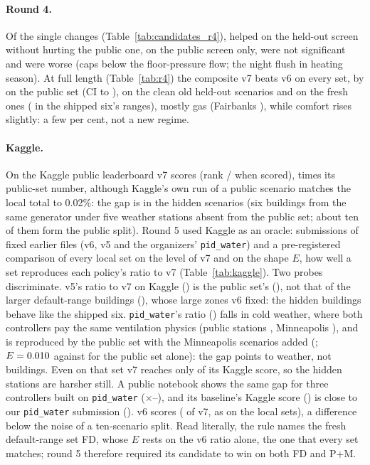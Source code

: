 \documentclass{article}
\begin{document}
\paragraph{Round 4.}
Of the \RFNSingles{} single changes (Table~\ref{tab:candidates_r4}), \RFNHelps{} helped on the held-out
screen without hurting the public one, \RFNPubOnly{} on the public screen only, \RFNNs{} were not significant
and \RFNWorse{} were worse (caps below the floor-pressure flow; the night flush in heating season). At full
length (Table~\ref{tab:r4}) the composite v7 beats v6 on every set, by \RFConfPubRed{} on the public set (CI
\RFConfPubRedLo{} to \RFConfPubRedHi), \RFConfOldCleanRed{} on the clean old held-out scenarios and
\RFConfFreshRed{} on the fresh ones (\RFConfFreshShipRed{} in the shipped six's ranges), mostly gas
(Fairbanks \RFDecPubFairbanksRel), while comfort rises slightly: a few per cent, not a new regime.



\paragraph{Kaggle.}
On the Kaggle public leaderboard v7 scores \RFiveKagVSeven{} (rank \RFiveKagRankVSeven/\RFiveKagTeamsVSeven{}
when scored), \RFiveKagGapPub{} times its public-set number, although Kaggle's own run of a public scenario
matches the local total to 0.02\%: the gap is in the hidden scenarios (six buildings from the same generator
under five weather stations absent from the public set; about ten of them form the public split). Round 5
used Kaggle as an oracle: \RFiveNProbes{} submissions of fixed earlier files (v6, v5 and the organizers'
\texttt{pid\_water}) and a pre-registered comparison of every local set on the level of v7 and on the
shape $E$, how well a set reproduces each policy's ratio to v7 (Table~\ref{tab:kaggle}). Two probes
discriminate. v5's ratio to v7 on Kaggle (\RFiveKagRatioVFive) is the public set's (\RFivePubRatioVFive),
not that of the larger default-range buildings (\RFiveOldRatioVFive), whose large zones v6 fixed: the
hidden buildings behave like the shipped six. \texttt{pid\_water}'s ratio (\RFiveKagRatioPid) falls in cold
weather, where both controllers pay the same ventilation physics (public stations \RFivePubRatioPid,
Minneapolis \RFiveMinnRatioPid), and is reproduced by the public set with the Minneapolis scenarios added
(\RFivePubMinnRatioPid; $E=0.010$ against \RFivePubShapeErr{} for the public set alone):
the gap points to weather, not buildings. Even on that set v7 reaches only \RFivePubMinnLevel{} of its Kaggle
score, so the hidden stations are harsher still. A public notebook shows the same gap for three controllers built on
\texttt{pid\_water} ($\times$\RFiveThirdARatio--\RFiveThirdCRatio), and its baseline's Kaggle score
(\RFiveThirdAKag) is close to our \texttt{pid\_water} submission (\RFiveKagPid). v6 scores \RFiveKagVSix{}
(\RFiveKagRatioVSix{} of v7, as on the local sets), a difference below the noise of a ten-scenario split.
Read literally, the rule names the fresh default-range set FD, whose $E$ rests on the v6 ratio alone, the one
that every set matches; round 5 therefore required its candidate to win on both FD and P+M.
\end{document}
